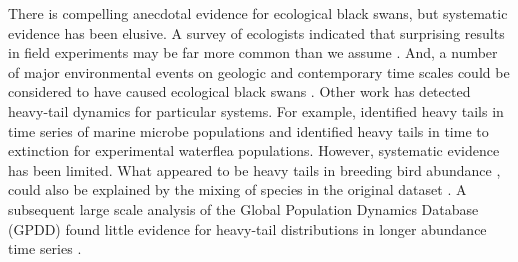 There is compelling anecdotal evidence for ecological black swans, but
systematic evidence has been elusive. A survey of ecologists indicated that
surprising results in field experiments may be far more common than we assume
\citep{doak2008}. And, a number of major environmental events on geologic and
contemporary time scales could be considered to have caused ecological black
swans \citep{nunez2012}. Other work has detected heavy-tail dynamics for
particular systems. For example, \citet{segura2013} identified heavy tails in
time series of marine microbe populations and \citet{drake2014} identified
heavy tails in time to extinction for experimental waterflea populations.
However, systematic evidence has been limited. What appeared to be heavy tails
in breeding bird abundance \citep{keitt1998}, could also be explained by the
mixing of species in the original dataset \citep{allen2001}. A subsequent
large scale analysis of the Global Population Dynamics Database (GPDD) found
little evidence for heavy-tail distributions in longer abundance time series
\citet{halley2002}.



